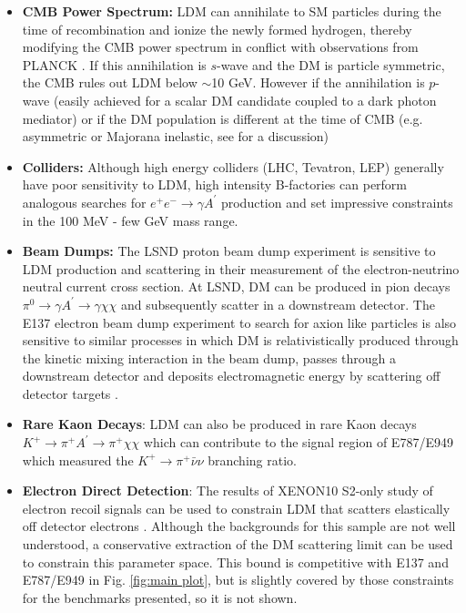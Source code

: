 \begin{itemize}

\item {\bf CMB Power Spectrum:} LDM can annihilate to SM particles during the time of recombination and ionize the newly 
formed hydrogen, thereby modifying the CMB power spectrum in conflict with observations from PLANCK \cite{dodge}. 
If this annihilation is $s$-wave and the DM is particle symmetric, the CMB rules out  LDM below $\sim $10 GeV. However
if the annihilation is $p$-wave (easily achieved for a scalar DM candidate coupled to a dark photon mediator) or 
if the DM population is different at the time of CMB (e.g. asymmetric or Majorana inelastic, see \cite{Izaguirre:2015yja} for a discussion)  
 
\item {\bf Colliders:} Although high energy colliders (LHC, Tevatron, LEP) generally have poor sensitivity to LDM, high intensity B-factories 
can perform analogous searches for $e^+e^- \to \gamma A^\prime$ production and set impressive constraints in the 100 MeV - few GeV 
mass range. 

\item {\bf Beam Dumps: } The LSND proton beam dump experiment  \cite{deNiverville:2011it} is sensitive to LDM production and scattering
in their measurement of the electron-neutrino neutral current cross section. At LSND, DM can be produced in pion decays $\pi^0 \to \gamma A^\prime \to \gamma \chi \chi$
and subsequently scatter in a downstream detector.  The E137 electron beam dump experiment  to search for axion like particles is also sensitive to 
similar processes in which DM is relativistically  produced through the kinetic mixing interaction in the beam dump, passes through a downstream 
 detector and deposits electromagnetic energy by scattering off detector targets  \cite{Batell:2014mga}. 

\item{\bf Rare Kaon Decays}: LDM can also be produced in rare Kaon decays $K^+ \to \pi^+ A^\prime \to \pi^+ \chi \chi$ which 
can contribute to the signal region of E787/E949  \cite{Adler:1997am,Artamonov:2008qb} which measured the $K^+ \to \pi^+ \bar \nu \nu$ branching ratio. 

\item{\bf Electron Direct Detection}: The results of XENON10 S2-only study of electron recoil signals can be used to 
constrain LDM that scatters elastically off detector electrons \cite{Essig:2012yx}. Although the backgrounds for this sample are not well understood,
a conservative extraction of the DM scattering limit can be used to constrain this parameter space. This bound is competitive with 
E137 and E787/E949 in Fig. \ref{fig:main plot}, but is slightly covered by those constraints for the benchmarks presented, so it is not shown.

\end{itemize}

